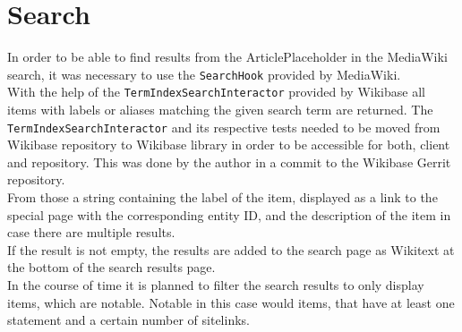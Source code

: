 \section{Search}
In order to be able to find results from the ArticlePlaceholder in the MediaWiki search, it was necessary to use the \texttt{\justify SearchHook} provided by MediaWiki. \citep{wiki:25} \\
With the help of the \texttt{\justify TermIndexSearchInteractor} provided by Wikibase all items with labels or aliases matching the given search term are returned. The \texttt{\justify TermIndexSearchInteractor} and its respective tests needed to be moved from Wikibase repository to Wikibase library in order to be accessible for both, client and repository. This was done by the author in a commit to the Wikibase Gerrit repository. \citep{gerrit:01}
\\
From those a string containing the label of the item, displayed as a link to the special page with the corresponding entity ID, and the description of the item in case there are multiple results.  \\
If the result is not empty, the results are added to the search page as Wikitext at the bottom of the search results page. \\
In the course of time it is planned to filter the search results to only display items, which are notable. Notable in this case would items, that have at least one statement and a certain number of sitelinks.
